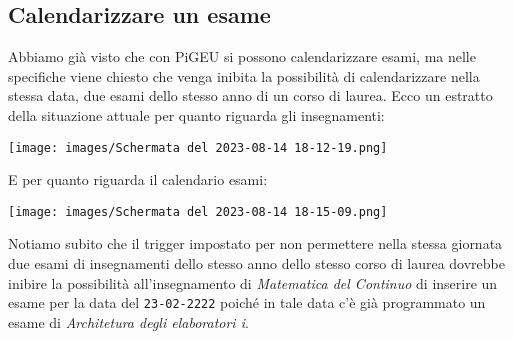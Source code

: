 \documentclass{article}
\begin{document}
\subsection{Calendarizzare un esame}
Abbiamo già visto che con PiGEU si possono calendarizzare esami, ma nelle specifiche viene chiesto che venga inibita la possibilità di calendarizzare nella stessa data, due esami dello stesso anno di un corso di laurea.
Ecco un estratto della situazione attuale per quanto riguarda gli insegnamenti:

\texttt{[image: images/Schermata del 2023-08-14 18-12-19.png]}

E per quanto riguarda il calendario esami:

\texttt{[image: images/Schermata del 2023-08-14 18-15-09.png]}

Notiamo subito che il trigger impostato per non permettere nella stessa giornata due esami di insegnamenti dello stesso anno dello stesso corso di laurea dovrebbe inibire la possibilità all'insegnamento di \textit{Matematica del Continuo} di inserire un esame per la data del \texttt{23-02-2222} poiché in tale data c'è già programmato un esame di \textit{Architetura degli elaboratori i}.
\end{document}
